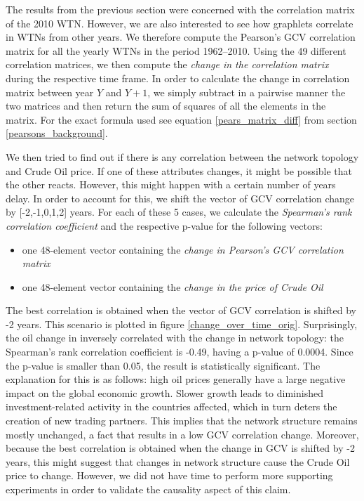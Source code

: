 The results from the previous section were concerned with the correlation matrix of the 2010 WTN. However, we are also interested to see how graphlets correlate in WTNs from other years. We therefore compute the Pearson's GCV correlation matrix for all the yearly WTNs in the period 1962--2010. Using the 49 different correlation matrices, we then compute the \emph{change in the correlation matrix} during the respective time frame. In order to calculate the change in correlation matrix between year $Y$ and $Y+1$, we simply subtract in a pairwise manner the two matrices and then return the sum of squares of all the elements in the matrix. For the exact formula used see equation \ref{pears_matrix_diff} from section \ref{pearsons_background}. 

We then tried to find out if there is any correlation between the network topology and Crude Oil price. If one of these attributes changes, it might be possible that the other reacts. However, this might happen with a certain number of years delay. In order to account for this, we shift the vector of GCV correlation change by [-2,-1,0,1,2] years. For each of these 5 cases, we calculate the \emph{Spearman's rank correlation coefficient} and the respective p-value for the following vectors:
\begin{itemize}
 \item one 48-element vector containing the \emph{change in Pearson's GCV correlation matrix}
 \item one 48-element vector containing the \emph{change in the price of Crude Oil}
\end{itemize}


The best correlation is obtained when the vector of GCV correlation is shifted by -2 years. This scenario is plotted in figure \ref{change_over_time_orig}. Surprisingly, the oil change in inversely correlated with the change in network topology: the Spearman's rank correlation coefficient is -0.49, having a p-value of 0.0004. Since the p-value is smaller than 0.05, the result is statistically significant. The explanation for this is as follows: high oil prices generally have a large negative impact on the global economic growth. Slower growth leads to diminished investment-related activity in the countries affected, which in turn deters the creation of new trading partners. This implies that the network structure remains mostly unchanged, a fact that results in a low GCV correlation change. Moreover, because the best correlation is obtained when the change in GCV is shifted by -2 years, this might suggest that changes in network structure cause the Crude Oil price to change. However, we did not have time to 
perform more supporting experiments in order to validate the causality aspect of this claim.

